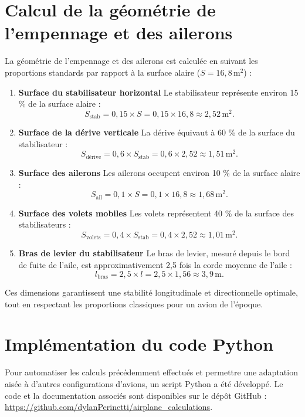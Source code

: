 \documentclass[12pt,a4paper]{article}
\begin{document}
\section{Calcul de la géométrie de l’empennage et des ailerons}

La géométrie de l’empennage et des ailerons est calculée en suivant les proportions standards par rapport à la surface alaire ($S = 16{,}8 \, \text{m}^2$) :

\begin{enumerate}[label=\arabic*.]
    \item \textbf{Surface du stabilisateur horizontal}  
    Le stabilisateur représente environ 15 \% de la surface alaire :
    \[
    S_{\text{stab}} = 0{,}15 \times S = 0{,}15 \times 16{,}8 \approx 2{,}52 \, \text{m}^2.
    \]
    \item \textbf{Surface de la dérive verticale}  
    La dérive équivaut à 60 \% de la surface du stabilisateur :
    \[
    S_{\text{dérive}} = 0{,}6 \times S_{\text{stab}} = 0{,}6 \times 2{,}52 \approx 1{,}51 \, \text{m}^2.
    \]
    \item \textbf{Surface des ailerons}  
    Les ailerons occupent environ 10 \% de la surface alaire :
    \[
    S_{\text{ail}} = 0{,}1 \times S = 0{,}1 \times 16{,}8 \approx 1{,}68 \, \text{m}^2.
    \]
    \item \textbf{Surface des volets mobiles}  
    Les volets représentent 40 \% de la surface des stabilisateurs :
    \[
    S_{\text{volets}} = 0{,}4 \times S_{\text{stab}} = 0{,}4 \times 2{,}52 \approx 1{,}01 \, \text{m}^2.
    \]
    \item \textbf{Bras de levier du stabilisateur}  
    Le bras de levier, mesuré depuis le bord de fuite de l’aile, est approximativement 2,5 fois la corde moyenne de l’aile :
    \[
    l_{\text{bras}} = 2{,}5 \times l = 2{,}5 \times 1{,}56 \approx 3{,}9 \, \text{m}.
    \]
\end{enumerate}

Ces dimensions garantissent une stabilité longitudinale et directionnelle optimale, tout en respectant les proportions classiques pour un avion de l’époque.

\section{Implémentation du code Python}

Pour automatiser les calculs précédemment effectués et permettre une adaptation aisée à d'autres configurations d'avions, un script Python a été développé. Le code et la documentation associés sont disponibles sur le dépôt GitHub : \url{https://github.com/dylanPerinetti/airplane_calculations}.
\end{document}
